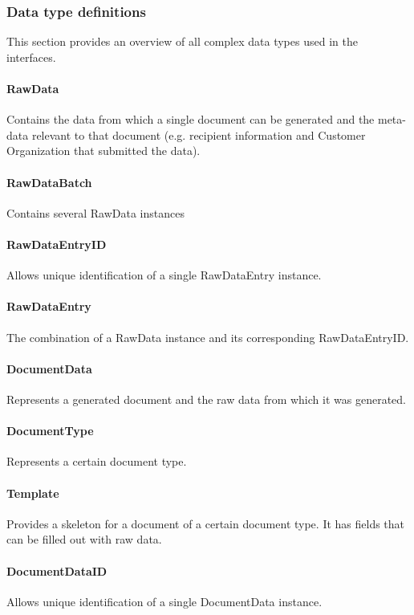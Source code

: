 \documentclass[a4paper,10pt]{article}
\begin{document}
\subsubsection{Data type definitions}
This section provides an overview of all complex data types used in the interfaces.

\paragraph{RawData} Contains the data from which a single document can be generated and the meta-data relevant to that document (e.g. recipient information and Customer Organization that submitted the data).

\paragraph{RawDataBatch} Contains several RawData instances

\paragraph{RawDataEntryID} Allows unique identification of a single RawDataEntry instance.

\paragraph{RawDataEntry} The combination of a RawData instance and its corresponding RawDataEntryID.

\paragraph{DocumentData} Represents a generated document and the raw data from which it was generated.

\paragraph{DocumentType} Represents a certain document type.

\paragraph{Template} Provides a skeleton for a document of a certain document type. It has fields that can be filled out with raw data.

\paragraph{DocumentDataID} Allows unique identification of a single DocumentData instance. 
\end{document}
